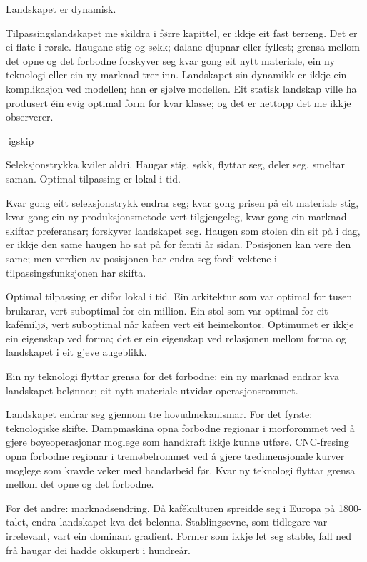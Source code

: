 
Landskapet er dynamisk.

Tilpassingslandskapet me skildra i førre kapittel, er ikkje eit fast terreng. Det er ei flate i rørsle. Haugane stig og søkk; dalane djupnar eller fyllest; grensa mellom det opne og det forbodne forskyver seg kvar gong eit nytt materiale, ein ny teknologi eller ein ny marknad trer inn. Landskapet sin dynamikk er ikkje ein komplikasjon ved modellen; han er sjølve modellen. Eit statisk landskap ville ha produsert éin evig optimal form for kvar klasse; og det er nettopp det me ikkje observerer.

igskip

Seleksjonstrykka kviler aldri. Haugar stig, søkk, flyttar seg, deler seg, smeltar saman. Optimal tilpassing er lokal i tid.

Kvar gong eitt seleksjonstrykk endrar seg; kvar gong prisen på eit materiale stig, kvar gong ein ny produksjonsmetode vert tilgjengeleg, kvar gong ein marknad skiftar preferansar; forskyver landskapet seg. Haugen som stolen din sit på i dag, er ikkje den same haugen ho sat på for femti år sidan. Posisjonen kan vere den same; men verdien av posisjonen har endra seg fordi vektene i tilpassingsfunksjonen har skifta.

Optimal tilpassing er difor lokal i tid. Ein arkitektur som var optimal for tusen brukarar, vert suboptimal for ein million. Ein stol som var optimal for eit kafémiljø, vert suboptimal når kafeen vert eit heimekontor. Optimumet er ikkje ein eigenskap ved forma; det er ein eigenskap ved relasjonen mellom forma og landskapet i eit gjeve augeblikk.

Ein ny teknologi flyttar grensa for det forbodne; ein ny marknad endrar kva landskapet belønnar; eit nytt materiale utvidar operasjonsrommet.

Landskapet endrar seg gjennom tre hovudmekanismar. For det fyrste: teknologiske skifte. Dampmaskina opna forbodne regionar i morforommet ved å gjere bøyeoperasjonar moglege som handkraft ikkje kunne utføre. CNC-fresing opna forbodne regionar i tremøbelrommet ved å gjere tredimensjonale kurver moglege som kravde veker med handarbeid før. Kvar ny teknologi flyttar grensa mellom det opne og det forbodne.

For det andre: marknadsendring. Då kafékulturen spreidde seg i Europa på 1800-talet, endra landskapet kva det belønna. Stablingsevne, som tidlegare var irrelevant, vart ein dominant gradient. Former som ikkje let seg stable, fall ned frå haugar dei hadde okkupert i hundreår.

